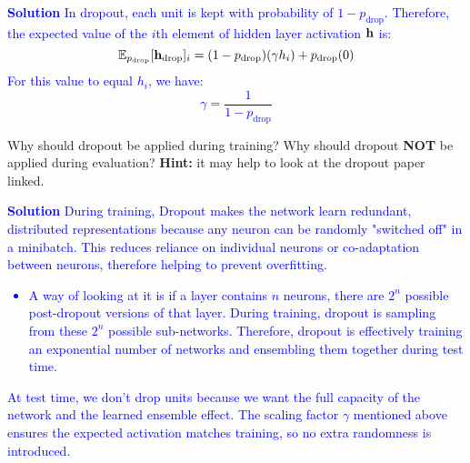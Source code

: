 \begin{parts}
\begin{subparts}
            \textcolor{blue}{
                \textbf{Solution}
                In dropout, each unit is kept with probability of $1-p_{\text{drop}}$. Therefore, the expected value of the $i$th element of hidden layer activation $\mathbf{h}$ is: 
                \begin{equation*}
                    \mathbb{E}_{p_{\text{drop}}}[\mathbf{h}_\text{drop}]_i = (1-p_{\text{drop}})(\gamma h_i) + p_{\text{drop}}(0)
                \end{equation*}
                For this value to equal $h_i$, we have:
                \begin{equation*}
                    \gamma = \frac{1}{1-p_{\text{drop}}}
                \end{equation*} 
            } \newline
            
          \subpart[2] Why should dropout be applied during training? Why should dropout \textbf{NOT} be applied during evaluation? \textbf{Hint:} it may help to look at the dropout paper linked. \newline

           \textcolor{blue}{
                \textbf{Solution}
              During training, Dropout makes the network learn redundant, distributed representations because any neuron can be randomly "switched off" in a minibatch. This reduces reliance on individual neurons or co-adaptation between neurons, therefore helping to prevent overfitting. 
              \begin{itemize}
                  \item A way of looking at it is if a layer contains $n$ neurons, there are $2^n$ possible post-dropout versions of that layer. During training, dropout is sampling from these $2^n$ possible sub-networks. Therefore, dropout is effectively training an exponential number of networks and ensembling them together during test time.
              \end{itemize}
              At test time, we don't drop units because we want the full capacity of the network and the learned ensemble effect. The scaling factor $\gamma$ mentioned above ensures the expected activation matches training, so no extra randomness is introduced. 
            }
         
        \end{subparts}


\end{parts}
